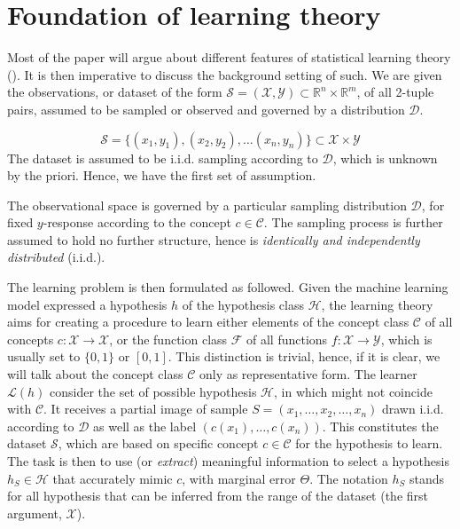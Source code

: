 \documentclass[
  journal=largetwo,
  year=2025,
  volume=37,
]{cup-journal}
\begin{document}
\section{Foundation of learning theory}

Most of the paper will argue about different features of statistical learning theory (\cite{Sterkenburg_2024,Vapnik1999-VAPTNO,STL_Hajek_Maxim_2021}). It is then imperative to discuss the background setting of such. We are given the observations, or dataset of the form $\mathcal{S}=(\mathcal{X},\mathcal{Y})\subset \mathbb{R}^{n}\times \mathbb{R}^{m}$, of all 2-tuple pairs, assumed to be sampled or observed and governed by a distribution $\mathcal{D}$. 

\begin{equation*}
    \mathcal{S} = \{ (x_1,y_1), (x_2, y_2),\dots(x_n,y_n) \} \subset \mathcal{X}\times \mathcal{Y}
\end{equation*}
The dataset is assumed to be i.i.d. sampling according to $\mathcal{D}$, which is unknown by the priori. Hence, we have the first set of assumption. 
\begin{assumption}
The observational space is governed by a particular sampling distribution $\mathcal{D}$, for fixed $y$-response according to the concept $c\in \mathcal{C}$. The sampling process is further assumed to hold no further structure, hence is \textit{identically and independently distributed} (i.i.d.). 
\end{assumption}

The learning problem is then formulated as followed. Given the machine learning model expressed a hypothesis $h$ of the hypothesis class $\mathcal{H}$, the learning theory aims for creating a procedure to learn either elements of the concept class $\mathcal{C}$ of all concepts $c: \mathcal{X}\to \mathcal{X}$, or the function class $\mathcal{F}$ of all functions $f: \mathcal{X}\to \mathcal{Y}$, which is usually set to $\{0,1\}$ or $[0,1]$. This distinction is trivial, hence, if it is clear, we will talk about the concept class $\mathcal{C}$ only as representative form. The learner $\mathcal{L}(h)$ consider the set of possible hypothesis $\mathcal{H}$, in which might not coincide with $\mathcal{C}$. It receives a partial image of sample $S=(x_{1},\dots,x_{2},\dots,x_n)$ drawn i.i.d. according to $\mathcal{D}$ as well as the label $(c(x_1),\dots,c(x_n))$. This constitutes the dataset $\mathcal{S}$, which are based on specific concept $c\in \mathcal{C}$ for the hypothesis to learn. The task is then to use (or \textit{extract}) meaningful information to select a hypothesis $h_{S}\in \mathcal{H}$ that accurately mimic $c$, with marginal error $\Theta$. The notation $h_{S}$ stands for all hypothesis that can be inferred from the range of the dataset (the first argument, $\mathcal{X}$). 
\end{document}
